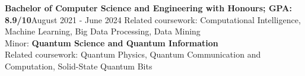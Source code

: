     {\textbf{Bachelor of Computer Science and Engineering with Honours;  GPA: 8.9/10}}{August 2021 - June 2024}
    \vspace{6pt}
    \scriptsize {\small{Related coursework: Computational Intelligence, Machine Learning, Big Data Processing, Data Mining}}\\
    \vspace{-3pt}
    \resumeItemListStart
    \resumeItemListEnd
    \scriptsize {\small{Minor: \textbf{Quantum Science and Quantum Information}}}\\
    \scriptsize {\small{Related coursework: Quantum Physics, Quantum Communication and Computation, Solid-State Quantum Bits}}